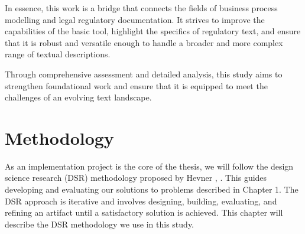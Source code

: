 In essence, this work is a bridge that connects the fields of business process modelling and legal regulatory documentation. It strives to improve the capabilities of the basic tool, highlight the specifics of regulatory text, and ensure that it is robust and versatile enough to handle a broader and more complex range of textual descriptions.

Through comprehensive assessment and detailed analysis, this study aims to strengthen \cite{yuImprovedAutogenerationBusiness2023} foundational work and ensure that it is equipped to meet the challenges of an evolving text landscape.





\pagebreak

\section{Methodology}
\label{sec:intro:meth}


As an implementation project is the core of the thesis, we will follow the design science research (DSR) methodology proposed by Hevner \cite{hevnerDesignScienceInformation2008}, \cite{vombrockeIntroductionDesignScience2020} \cite{peffersDesignScienceResearch}. This guides developing and evaluating our solutions to problems described in Chapter 1. The DSR approach is iterative and involves designing, building, evaluating, and refining an artifact until a satisfactory solution is achieved. This chapter will describe the DSR methodology we use in this study.

